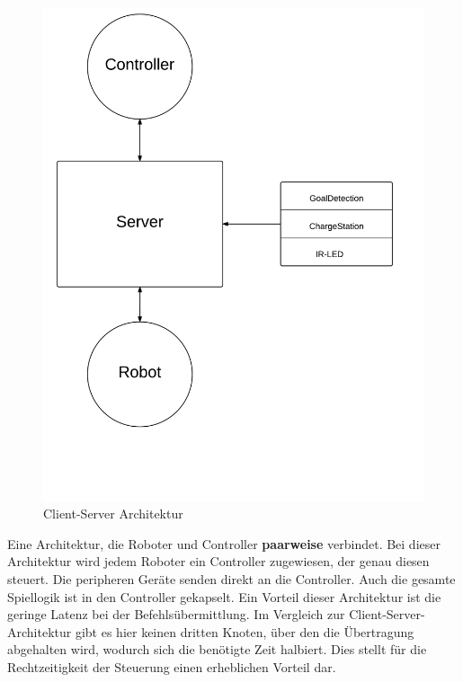 \begin{figure}[ht]
	\includegraphics[scale=0.25]{images/client-server_architektur.pdf}
	\caption{Client-Server Architektur}
	\label{fig:client-server_architektur}
\end{figure}


Eine Architektur, die Roboter und Controller \textbf{paarweise} verbindet. Bei dieser Architektur wird jedem Roboter ein Controller zugewiesen, der genau diesen steuert. Die peripheren Geräte senden direkt an die Controller. Auch die gesamte Spiellogik ist in den Controller gekapselt. Ein Vorteil dieser Architektur ist die geringe Latenz bei der Befehlsübermittlung. Im Vergleich zur Client-Server-Architektur gibt es hier keinen dritten Knoten, über den die Übertragung abgehalten wird, wodurch sich die benötigte Zeit halbiert. Dies stellt für die Rechtzeitigkeit der Steuerung einen erheblichen Vorteil dar.

